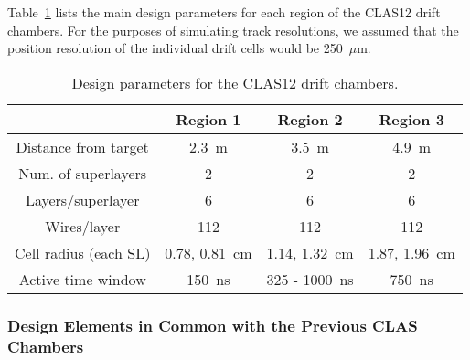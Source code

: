 Table~\ref{fwd-dc-design-parms} lists the main design parameters for each 
region of the CLAS12 drift chambers.  For the purposes of simulating 
track resolutions, we assumed that the position resolution of the individual 
drift cells would be 250~$\mu$m.  

\small{
\begin{table}[hbt]
\begin{center}
\begin{tabular}{||c|c|c|c||} \hline \hline
            &{\bf Region 1}&{\bf Region 2}&{\bf Region 3}\\ \hline
Distance from target & 2.3~m    & 3.5~m        & 4.9~m    \\ \hline
Num. of superlayers  & 2        & 2            & 2        \\ \hline
Layers/superlayer    & 6        & 6            & 6        \\ \hline
Wires/layer          & 112      & 112          & 112      \\ \hline
Cell radius (each SL) & 0.78, 0.81~cm  & 1.14, 1.32~cm      & 1.87, 1.96~cm  \\ \hline
Active time window   & 150~ns   & 325 - 1000~ns & 750~ns   \\ \hline
\end{tabular}
\caption{\small{Design parameters for the CLAS12 drift chambers.}}
\label{fwd-dc-design-parms}
\end{center}
\end{table}
}

\subsubsection{Design Elements in Common with the Previous CLAS Chambers}


